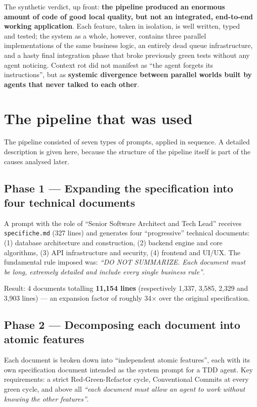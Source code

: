 \documentclass[11pt,a4paper]{article}
\newcommand{\file}[1]{\texttt{\small #1}}
\begin{document}
The synthetic verdict, up front: \textbf{the pipeline produced an enormous amount of code of good local quality, but not an integrated, end-to-end working application}. Each feature, taken in isolation, is well written, typed and tested; the system as a whole, however, contains three parallel implementations of the same business logic, an entirely dead queue infrastructure, and a hasty final integration phase that broke previously green tests without any agent noticing. Context rot did not manifest as ``the agent forgets its instructions'', but as \textbf{systemic divergence between parallel worlds built by agents that never talked to each other}.

\section{The pipeline that was used}

The pipeline consisted of seven types of prompts, applied in sequence. A detailed description is given here, because the structure of the pipeline itself is part of the causes analysed later.

\subsection{Phase 1 --- Expanding the specification into four technical documents}
A prompt with the role of ``Senior Software Architect and Tech Lead'' receives \file{specifiche.md} (327 lines) and generates four ``progressive'' technical documents: (1) database architecture and construction, (2) backend engine and core algorithms, (3) API infrastructure and security, (4) frontend and UI/UX. The fundamental rule imposed was: \emph{``DO NOT SUMMARIZE. Each document must be long, extremely detailed and include every single business rule''}.

Result: 4 documents totalling \textbf{11{,}154 lines} (respectively 1{,}337, 3{,}585, 2{,}329 and 3{,}903 lines) --- an expansion factor of roughly 34$\times$ over the original specification.

\subsection{Phase 2 --- Decomposing each document into atomic features}
Each document is broken down into ``independent atomic features'', each with its own specification document intended as the system prompt for a TDD agent. Key requirements: a strict Red-Green-Refactor cycle, Conventional Commits at every green cycle, and above all \emph{``each document must allow an agent to work without knowing the other features''}.
\end{document}
